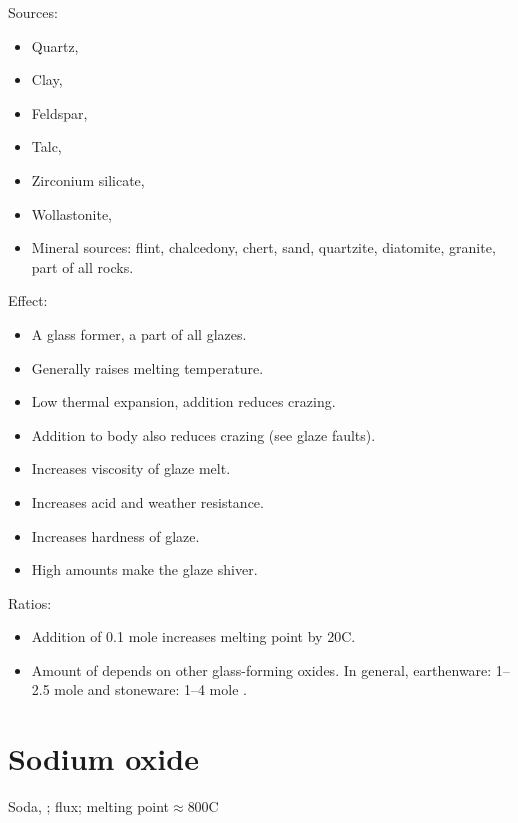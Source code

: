 Sources:
\begin{itemize}
  \item Quartz, 
  \item Clay, 
  \item Feldspar, 
  \item Talc, 
  \item Zirconium silicate, 
  \item Wollastonite, 
  \item Mineral sources: flint, chalcedony, chert, sand, quartzite, diatomite, 
  granite, part of all rocks.
\end{itemize}
Effect:
\begin{itemize}
  \item A glass former, a part of all glazes.
  \item Generally raises melting temperature.
  \item Low thermal expansion, addition reduces crazing.
  \item Addition to body also reduces crazing (see glaze faults).
  \item Increases viscosity of glaze melt.
  \item Increases acid and weather resistance.
  \item Increases hardness of glaze.
  \item High amounts make the glaze shiver.
\end{itemize}
Ratios:
\begin{itemize}
  \item Addition of 0.1 mole  increases melting point by 20\degree C.
  \item Amount of  depends on other glass-forming oxides. In general, 
  earthenware: 1--2.5 mole  and stoneware: 1--4 mole .  
\end{itemize}
\section{Sodium oxide}
Soda, ; flux; melting point$\approx$800\degree C

